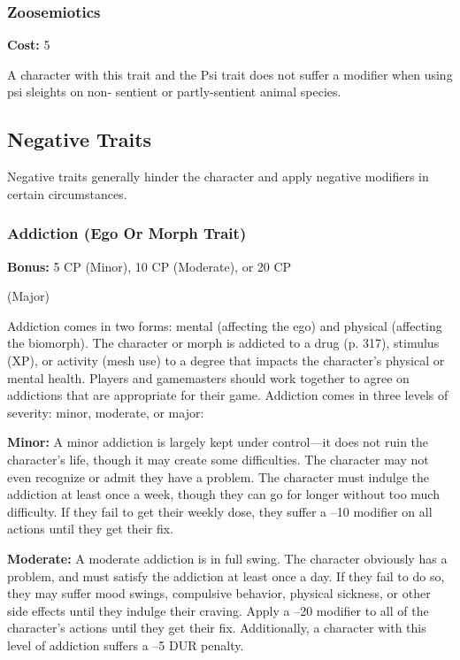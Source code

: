 \subsubsection{Zoosemiotics}

\textbf{Cost:} 5

A character with this trait and the Psi trait does 
not suffer a modifier when using psi sleights on non-
sentient or partly-sentient animal species.

\subsection{Negative Traits}


Negative traits generally hinder the character and 
apply negative modifiers in certain circumstances.

\subsubsection{Addiction (Ego Or Morph Trait)}

\textbf{Bonus:} 5 CP (Minor), 10 CP (Moderate), or 20 CP 

(Major)

Addiction comes in two forms: mental (affecting 
the ego) and physical (affecting the biomorph). The 
character or morph is addicted to a drug (p. 317), 
stimulus (XP), or activity (mesh use) to a degree that 
impacts the character's physical or mental health. 
Players and gamemasters should work together to 
agree on addictions that are appropriate for their 
game. Addiction comes in three levels of severity: 
minor, moderate, or major:

\textbf{Minor:} A minor addiction is largely kept under 
control—it does not ruin the character's life, though 
it may create some difficulties. The character may not 
even recognize or admit they have a problem. The 
character must indulge the addiction at least once 
a week, though they can go for longer without too 
much difficulty. If they fail to get their weekly dose, 
they suffer a –10 modifier on all actions until they get 
their fix.

\textbf{Moderate:} A moderate addiction is in full swing. 
The character obviously has a problem, and must 
satisfy the addiction at least once a day. If they fail 
to do so, they may suffer mood swings, compulsive 
behavior, physical sickness, or other side effects until 
they indulge their craving. Apply a –20 modifier to 
all of the character's actions until they get their fix. 
Additionally, a character with this level of addiction 
suffers a –5 DUR penalty.

